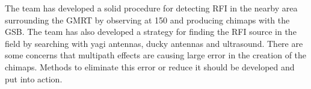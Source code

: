 \documentclass[a4paper,12pt]{article}
\begin{document}
                                                                                                                                                                                                                                                                                                                                                                                                                                                                                                                                                                                                                                                                                                                                                                                                                                                                                                                                                                                                                                                                                                                                                                                                                                                                                                                                                                                                                                                                                                                                                                                                                                                                                                                                                                                                                                                                                                                                                                                                                                                                                                                                                                                                                                                                                                                                                                                                                                                                                                                                                                                                                                                                                                                                                                                                                                                                                                                                       The team has developed a solid procedure for detecting RFI in the nearby area surrounding the GMRT by observing at \unit{150}{\mega\hertz} and producing chimaps with the GSB. The team has also developed a strategy for finding the RFI source in the field by searching with yagi antennas, ducky antennas and ultrasound. There are some concerns that multipath effects are causing large error in the creation of the chimaps. Methods to eliminate this error or reduce it should be developed and put into action. 
\end{document}

